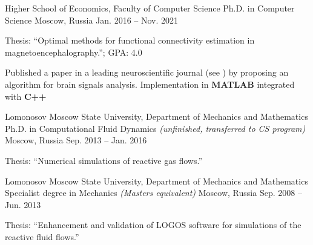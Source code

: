 \begin{cventries}
  \cventry
    {Higher School of Economics, Faculty of Computer Science}
    {Ph.D. in Computer Science}
    {Moscow, Russia}
    {Jan. 2016 -- Nov. 2021}
    {
      \begin{cvitems}
        \item {Thesis: ``Optimal methods for functional connectivity estimation in magnetoencephalography.''; GPA: 4.0}
      \item{Published a paper in a leading neuroscientific journal (see \cite{psiicos}})
          by proposing an algorithm for brain signals analysis. Implementation in \textbf{MATLAB} integrated with \textbf{C++}
      \end{cvitems}
    }
  \cventry
    {Lomonosov Moscow State University, Department of Mechanics and Mathematics}
    {Ph.D. in Computational Fluid Dynamics \emph{(unfinished, transferred to CS program)}}
    {Moscow, Russia}
    {Sep. 2013 --  Jan. 2016}
    {
      \begin{cvitems}
        \item {Thesis: ``Numerical simulations of reactive gas flows.''}
      \end{cvitems}
    }
  \cventry
    {Lomonosov Moscow State University, Department of Mechanics and Mathematics}
{Specialist degree in Mechanics \emph{(Masters equivalent)}}
    {Moscow, Russia}
    {Sep. 2008 -- Jun. 2013}
    {
      \begin{cvitems}
        \item{Thesis: ``Enhancement and validation of LOGOS software for simulations of the reactive fluid flows.''}
      \end{cvitems}
    }
\end{cventries}

